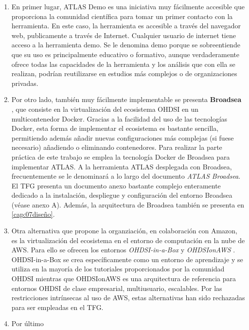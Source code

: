 \begin{enumerate}[label=\alph*.]

    \item En primer lugar, ATLAS Demo es una iniciativa muy fácilmente accesible que proporciona la comunidad científica para tomar un primer contacto con la herramienta. En este caso, la herramienta es accesible a través del navegador web, publicamente a través de Internet. Cualquier usuario de internet tiene acceso a la herramienta demo. Se le denomina demo porque se sobreentiende que su uso es principalmente educativo o formativo, aunque verdaderamente ofrece todas las capacidades de la herramienta y los análisis que con ella se realizan, podrían reutilizarse en estudios más complejos o de organizaciones privadas.

    \item Por otro lado, también muy fácilmente implementable se presenta \textbf{Broadsea} \cite{githubBroadsea}, que consiste en la virtualización del ecosistema OHDSI en un multicontenedor Docker. Gracias a la facilidad del uso de las tecnologías Docker, esta forma de implementar el ecosistema es bastante sencilla, permitiendo además añadir nuevas configuraciones más complejas (si fuese necesario) añadiendo o eliminando contenedores. Para realizar la parte práctica de este trabajo se emplea la tecnología Docker de Broadsea para implementar ATLAS. A la herramienta ATLAS desplegada con Broadsea, frecuentemente se le denominará a lo largo del documento \textit{ATLAS Broadsea}. El TFG presenta un documento anexo bastante complejo enteramente dedicado a la instalación, despliegue y configuración del entorno Broadsea (véase anexo A). Además, la arquitectura de Broadsea también se presenta en \ref{cap:07diseño}.

    \item Otra alternativa que propone la organziación, en colaboración con Amazon, es la virtualización del ecosistema en el entorno de computación en la nube de AWS. Para ello se ofrecen los entornos \textit{OHDSI-in-a-Box} \cite{githubOHDSIBox}y \textit{OHDSIonAWS} \cite{githubOHDSIAWS}. OHDSI-in-a-Box se crea específicamente como un entorno de aprendizaje y se utiliza en la mayoría de los tutoriales proporcionados por la comunidad OHDSI mientras que OHDSIonAWS es una arquitectura de referencia para entornos OHDSI de clase empresarial, multiusuario, escalables. Por las restricciones intrínsecas al uso de AWS, estas alternativas han sido rechazadas para ser empleadas en el TFG.
    
    \item Por último
    
\end{enumerate}

